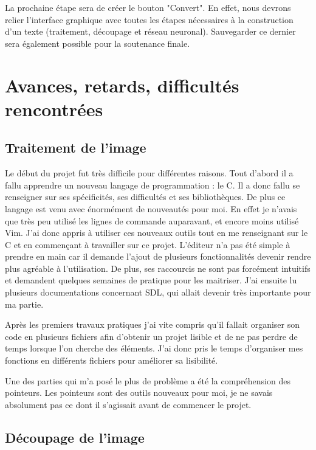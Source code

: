 \documentclass[12pt]{report}
\begin{document}
La prochaine étape sera de créer le bouton "Convert". En effet, nous devrons relier l’interface graphique avec toutes les étapes nécessaires à la construction d’un texte (traitement, découpage et réseau neuronal). Sauvegarder ce dernier sera également possible pour la soutenance finale.

\chapter{Avances, retards, difficultés rencontrées}

\section*{Traitement de l'image}

Le début du projet fut très difficile pour différentes raisons. Tout d’abord il a fallu apprendre un nouveau langage de programmation : le C. Il a donc fallu se renseigner sur ses spécificités, ses difficultés et ses bibliothèques. De plus ce langage est venu avec énormément de nouveautés pour moi. En effet je n’avais que très peu utilisé les lignes de commande auparavant, et encore moins utilisé Vim. J’ai donc appris à utiliser ces nouveaux outils tout en me renseignant sur le C et en commençant à travailler sur ce projet. L'éditeur n’a pas été simple à prendre en main car il demande l’ajout de plusieurs fonctionnalités devenir rendre plus agréable à l’utilisation. De plus, ses raccourcis ne sont pas forcément intuitifs et demandent quelques semaines de pratique pour les maitriser. J’ai ensuite lu plusieurs documentations concernant SDL, qui allait devenir très importante pour ma partie. 

Après les premiers travaux pratiques j’ai vite compris qu’il fallait organiser son code en plusieurs fichiers afin d’obtenir un projet lisible et de ne pas perdre de temps lorsque l’on cherche des éléments. J’ai donc pris le temps d’organiser mes fonctions en différents fichiers pour améliorer sa lisibilité. 

Une des parties qui m’a posé le plus de problème a été la compréhension des pointeurs. Les pointeurs sont des outils nouveaux pour moi, je ne savais absolument pas ce dont il s'agissait avant de commencer le projet.  

\section*{Découpage de l'image}
\end{document}
